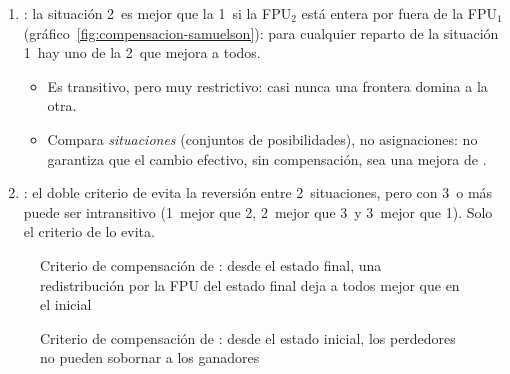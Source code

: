 \documentclass[11pt]{article}
\begin{document}
\begin{enumerate}
  \begin{itemize}
  \item En el panel a) del gráfico~\ref{fig:compensacion-little}, la distribución se mide por la distancia del rayo de cada punto a la bisectriz: de los puntos de la FPU$_2$ que cumplen el doble criterio respecto a 1 (2, 3, 4, 5~y 6), solo 2, 4~y 5~cumplen el de  (tabla~\ref{tab:compensacion-little}).
  \item En el panel b), con FPU que se cortan, solo el tramo resaltado de la FPU$_2$, entre el corte de las 2~FPU y 4, es preferido a 1.
  \item Puede contradecir al criterio de : rechaza el paso a 3, que mejora a $A$ sin empeorar a $B$, porque empeora la distribución.
  \end{itemize}
\item \emph{}\nocite{Samuelson1950Evaluation}: la situación 2~es mejor que la 1~si la FPU$_2$ está entera por fuera de la FPU$_1$ (gráfico~\ref{fig:compensacion-samuelson}): para cualquier reparto de la situación 1~hay uno de la 2~que mejora a todos.
  \begin{itemize}
  \item Es transitivo, pero muy restrictivo: casi nunca una frontera domina a la otra.
  \item Compara \emph{situaciones} (conjuntos de posibilidades), no asignaciones: no garantiza que el cambio efectivo, sin compensación, sea una mejora de .
  \end{itemize}
\item \emph{}\nocite{Gorman1955Intransitivity}: el doble criterio de  evita la reversión entre 2~situaciones, pero con 3~o más puede ser intransitivo (1~mejor que 2, 2~mejor que 3~y 3~mejor que 1). Solo el criterio de  lo evita.
\end{enumerate}

\begin{figure}[H]
\centering
\caption{Criterio de compensación de : desde el estado final, una redistribución por la FPU del estado final deja a todos mejor que en el inicial}\label{fig:compensacion-kaldor}
\end{figure}

\begin{figure}[H]
\centering
\caption{Criterio de compensación de : desde el estado inicial, los perdedores no pueden sobornar a los ganadores}\label{fig:compensacion-hicks}
\end{figure}
\end{document}
